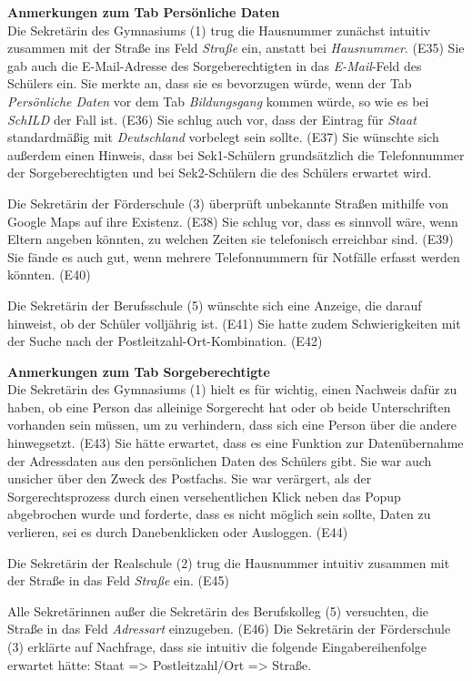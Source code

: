 \textbf{Anmerkungen zum Tab \glqq Persönliche Daten\grqq{}}\\
Die Sekretärin des Gymnasiums (1) trug die Hausnummer zunächst intuitiv zusammen mit der Straße ins Feld \textit{Straße} ein, anstatt bei \textit{Hausnummer}. (E35) Sie gab auch die E-Mail-Adresse des Sorgeberechtigten in das \textit{E-Mail}-Feld des Schülers ein. Sie merkte an, dass sie es bevorzugen würde, wenn der Tab \textit{Persönliche Daten} vor dem Tab \textit{Bildungsgang} kommen würde, so wie es bei \textit{SchILD}  der Fall ist. (E36) Sie schlug auch vor, dass der Eintrag für \textit{Staat} standardmäßig mit \textit{Deutschland} vorbelegt sein sollte. (E37) Sie wünschte sich außerdem einen Hinweis, dass bei Sek1-Schülern grundsätzlich die Telefonnummer der Sorgeberechtigten und bei Sek2-Schülern die des Schülers erwartet wird.

Die Sekretärin der Förderschule (3) überprüft unbekannte Straßen mithilfe von Google Maps auf ihre Existenz. (E38) Sie schlug vor, dass es sinnvoll wäre, wenn Eltern angeben könnten, zu welchen Zeiten sie telefonisch erreichbar sind. (E39) Sie fände es auch gut, wenn mehrere Telefonnummern für Notfälle erfasst werden könnten. (E40)

Die Sekretärin der Berufsschule (5) wünschte sich eine Anzeige, die darauf hinweist, ob der Schüler volljährig ist. (E41) Sie hatte zudem Schwierigkeiten mit der Suche nach der Postleitzahl-Ort-Kombination. (E42)

\textbf{Anmerkungen zum Tab \glqq Sorgeberechtigte\grqq{}}\\
Die Sekretärin des Gymnasiums (1) hielt es für wichtig, einen Nachweis dafür zu haben, ob eine Person das alleinige Sorgerecht hat oder ob beide Unterschriften vorhanden sein müssen, um zu verhindern, dass sich eine Person über die andere hinwegsetzt. (E43) Sie hätte erwartet, dass es eine Funktion zur Datenübernahme der Adressdaten aus den persönlichen Daten des Schülers gibt. Sie war auch unsicher über den Zweck des Postfachs. Sie war verärgert, als der Sorgerechtsprozess durch einen versehentlichen Klick neben das Popup abgebrochen wurde und forderte, dass es nicht möglich sein sollte, Daten zu verlieren, sei es durch Danebenklicken oder Ausloggen. (E44)

Die Sekretärin der Realschule (2) trug die Hausnummer intuitiv zusammen mit der Straße in das Feld \textit{Straße} ein. (E45)

Alle Sekretärinnen außer die Sekretärin des Berufskolleg (5) versuchten, die Straße in das Feld \textit{Adressart} einzugeben. (E46) Die Sekretärin der Förderschule (3) erklärte auf Nachfrage, dass sie intuitiv die folgende Eingabereihenfolge erwartet hätte: Staat => Postleitzahl/Ort => Straße.

